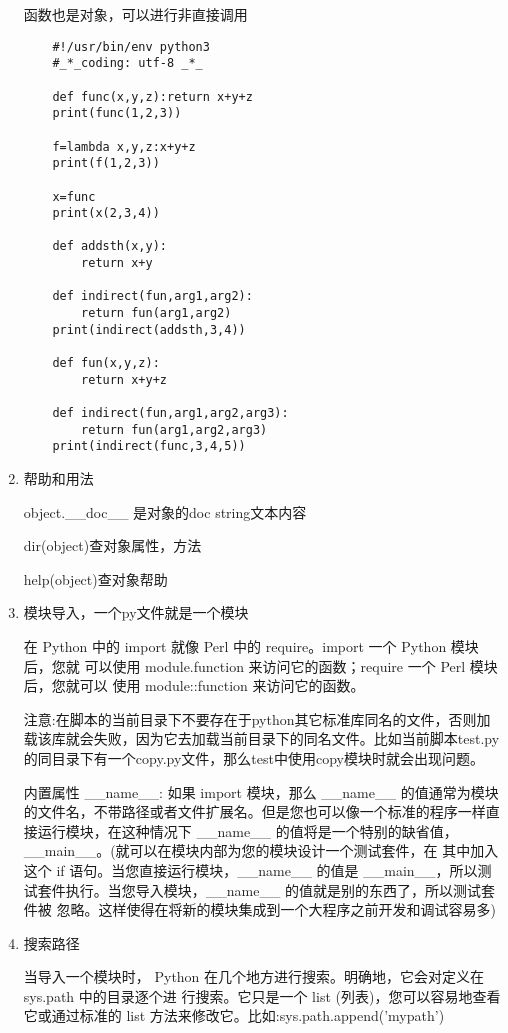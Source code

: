 \documentclass[twoside,11pt]{book}
\begin{document}
\begin{enumerate}
    函数也是对象，可以进行非直接调用
    \begin{lstlisting}
    #!/usr/bin/env python3
    #_*_coding: utf-8 _*_

    def func(x,y,z):return x+y+z
    print(func(1,2,3))

    f=lambda x,y,z:x+y+z
    print(f(1,2,3))

    x=func
    print(x(2,3,4))

    def addsth(x,y):
        return x+y

    def indirect(fun,arg1,arg2):
        return fun(arg1,arg2)
    print(indirect(addsth,3,4))

    def fun(x,y,z):
        return x+y+z

    def indirect(fun,arg1,arg2,arg3):
        return fun(arg1,arg2,arg3)
    print(indirect(func,3,4,5))
    \end{lstlisting}

  \item 帮助和用法

    object.\_\_doc\_\_ 是对象的doc string文本内容

    dir(object)查对象属性，方法

    help(object)查对象帮助


  \item 模块导入，一个py文件就是一个模块

    在 Python 中的 import 就像 Perl 中的 require。import 一个 Python 模块后，您就 可以使用 module.function 来访问它的函数；require 一个 Perl 模块后，您就可以 使用 module::function 来访问它的函数。

    注意:在脚本的当前目录下不要存在于python其它标准库同名的文件，否则加载该库就会失败，因为它去加载当前目录下的同名文件。比如当前脚本test.py的同目录下有一个copy.py文件，那么test中使用copy模块时就会出现问题。

    内置属性 \_\_name\_\_:
    如果 import 模块，那么 \_\_name\_\_ 的值通常为模块的文件名，不带路径或者文件扩展名。但是您也可以像一个标准的程序一样直接运行模块，在这种情况下 \_\_name\_\_ 的值将是一个特别的缺省值，\_\_main\_\_。(就可以在模块内部为您的模块设计一个测试套件，在 其中加入这个 if 语句。当您直接运行模块，\_\_name\_\_ 的值是 \_\_main\_\_，所以测 试套件执行。当您导入模块，\_\_name\_\_ 的值就是别的东西了，所以测试套件被 忽略。这样使得在将新的模块集成到一个大程序之前开发和调试容易多)

  \item 搜索路径

    当导入一个模块时， Python 在几个地方进行搜索。明确地，它会对定义在 sys.path 中的目录逐个进 行搜索。它只是一个 list (列表)，您可以容易地查看它或通过标准的 list 方法来修改它。比如:sys.path.append('mypath')


\end{enumerate}
\end{document}
